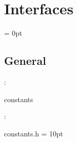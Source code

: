 
\section{Interfaces} 


\parskip = 0pt

\vspace{3mm} \subsection*{General}

: 

constants
\vspace{2mm}

\vspace{5mm}

: 



constants.h
\vspace{2mm}\parskip = 10pt 
